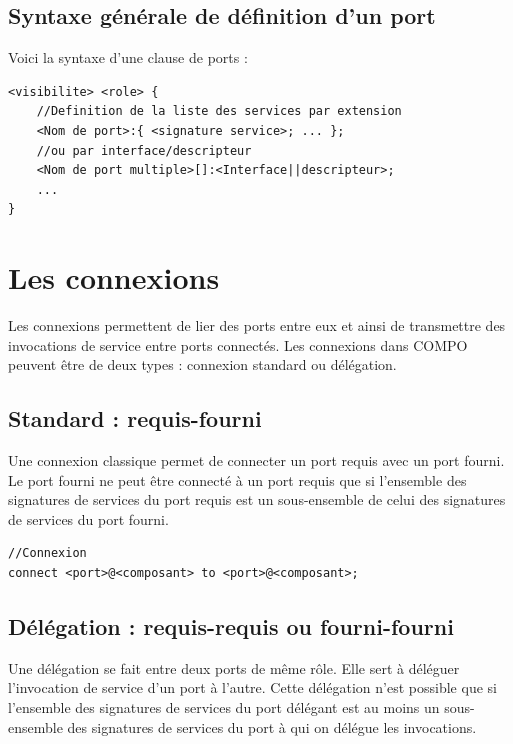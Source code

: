 \documentclass[11pt,a4paper,openany,oneside]{book}
\begin{document}
\subsection{Syntaxe générale de définition d'un port}

Voici la syntaxe d'une clause de ports : \\
\begin{lstlisting}[frame=single,caption=Syntaxe de la déclaration d'un port]
<visibilite> <role> {
    //Definition de la liste des services par extension
    <Nom de port>:{ <signature service>; ... };
    //ou par interface/descripteur
    <Nom de port multiple>[]:<Interface||descripteur>;
    ...
}
\end{lstlisting}

\section{Les connexions}

Les connexions permettent de lier des ports entre eux et ainsi de transmettre des invocations de service entre ports connectés.
Les connexions dans COMPO peuvent être de deux types : connexion standard ou délégation.

\subsection{Standard : requis-fourni}

Une connexion classique permet de connecter un port requis avec un port fourni. Le port fourni ne peut être connecté à un port requis que si l'ensemble des signatures de services du port requis est un sous-ensemble de celui des signatures de services du port fourni.

\begin{lstlisting}[language=Compo, frame=single, caption=Syntaxe de la connexion]
//Connexion
connect <port>@<composant> to <port>@<composant>; 
\end{lstlisting}

\subsection{Délégation : requis-requis ou fourni-fourni}
Une délégation se fait entre deux ports de même rôle. Elle sert à déléguer l'invocation de service d'un port à l'autre. Cette délégation n'est possible que si l'ensemble des signatures de services du port délégant est au moins un sous-ensemble des signatures de services du port à qui on délégue les invocations.
\end{document}
